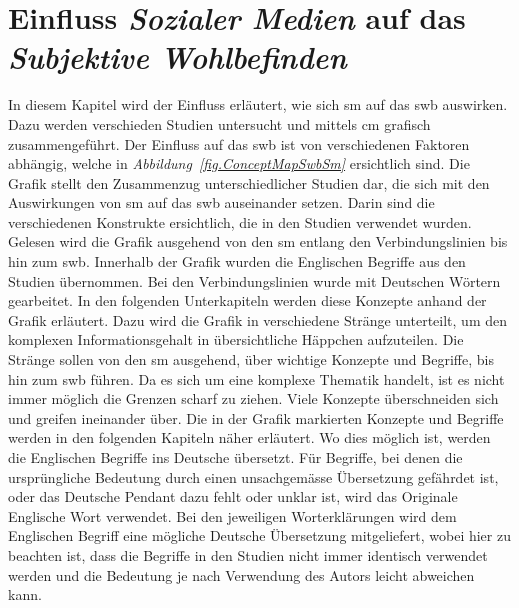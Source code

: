 %
%
\thispagestyle{empty}
\chapter{Einfluss \textit{Sozialer Medien} auf das \textit{Subjektive Wohlbefinden}}\label{chap.einfluss}
\glsresetall
In diesem Kapitel wird der Einfluss erläutert, wie sich \gls{sm} auf das \gls{swb} auswirken. Dazu werden verschieden Studien untersucht und mittels \gls{cm} grafisch zusammengeführt. Der Einfluss auf das \gls{swb} ist von verschiedenen Faktoren abhängig, welche in \textit{Abbildung~\ref{fig.ConceptMapSwbSm}} ersichtlich sind.\newline
Die Grafik stellt den Zusammenzug unterschiedlicher Studien dar, die sich mit den Auswirkungen von \gls{sm} auf das \gls{swb} auseinander setzen. Darin sind die verschiedenen Konstrukte ersichtlich, die in den Studien verwendet wurden. Gelesen wird die Grafik ausgehend von den \gls{sm} entlang den Verbindungslinien bis hin zum \gls{swb}.\newline
Innerhalb der Grafik wurden die Englischen Begriffe aus den Studien übernommen. Bei den Verbindungslinien wurde mit Deutschen Wörtern gearbeitet.\newline
In den folgenden Unterkapiteln werden diese Konzepte anhand der Grafik erläutert. Dazu wird die Grafik in verschiedene Stränge unterteilt, um den komplexen Informationsgehalt in übersichtliche Häppchen aufzuteilen. Die Stränge sollen von den \gls{sm} ausgehend, über wichtige Konzepte und Begriffe, bis hin zum \gls{swb} führen. Da es sich um eine komplexe Thematik handelt, ist es nicht immer möglich die Grenzen scharf zu ziehen. Viele Konzepte überschneiden sich und greifen ineinander über.\newline 
Die in der Grafik markierten Konzepte und Begriffe werden in den folgenden Kapiteln näher erläutert. Wo dies möglich ist, werden die Englischen Begriffe ins Deutsche übersetzt. Für Begriffe, bei denen die ursprüngliche Bedeutung durch einen unsachgemässe Übersetzung gefährdet ist, oder das Deutsche Pendant dazu fehlt oder unklar ist, wird das Originale Englische Wort verwendet. Bei den jeweiligen Worterklärungen wird dem Englischen Begriff eine mögliche Deutsche Übersetzung mitgeliefert, wobei hier zu beachten ist, dass die Begriffe in den Studien nicht immer identisch verwendet werden und die Bedeutung je nach Verwendung des Autors leicht abweichen kann.\newline 

